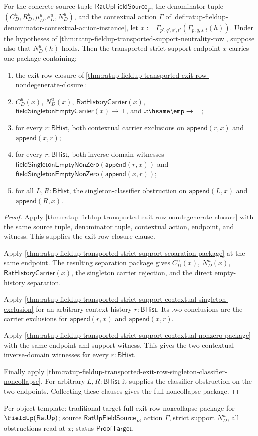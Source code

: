 \begin{theorem}
\label{thm:ratup-fieldup-transported-exit-row-full-noncollapse-package}
For the concrete source tuple $\mathsf{RatUpFieldSource}_F$, the denominator
tuple $(C_D^u,R_D^u,\mu_D^u,e_D^u,N_D^u)$, and the contextual action $\Gamma$ of
\autoref{def:ratup-fieldup-denominator-contextual-action-instance}, let
$x:=\Gamma_{p',q',s',t'}(\Gamma_{p,q,s,t}(h))$. Under the hypotheses of
\autoref{thm:ratup-fieldup-transported-support-neutrality-row}, suppose also
that $N_D^u(h)$ holds. Then the transported strict-support endpoint $x$
carries one package containing:
\begin{enumerate}
  \item the exit-row closure of
  \autoref{thm:ratup-fieldup-transported-exit-row-nondegenerate-closure};
  \item $C_D^u(x)$, $N_D^u(x)$, $\mathsf{RatHistoryCarrier}(x)$,
  $\mathsf{fieldSingletonEmptyCarrier}(x)\to\bot$, and $x\hsame\emp\to\bot$;
  \item for every $r:\mathsf{BHist}$, both contextual carrier exclusions on
  $\mathsf{append}(r,x)$ and $\mathsf{append}(x,r)$;
  \item for every $r:\mathsf{BHist}$, both inverse-domain witnesses
  $\mathsf{fieldSingletonEmptyNonZero}(\mathsf{append}(r,x))$ and
  $\mathsf{fieldSingletonEmptyNonZero}(\mathsf{append}(x,r))$;
  \item for all $L,R:\mathsf{BHist}$, the singleton-classifier obstruction on
  $\mathsf{append}(L,x)$ and $\mathsf{append}(R,x)$.
\end{enumerate}
\end{theorem}
\begin{proof}
Apply
\autoref{thm:ratup-fieldup-transported-exit-row-nondegenerate-closure} with the
same source tuple, denominator tuple, contextual action, endpoint, and witness.
This supplies the exit-row closure clause.

Apply
\autoref{thm:ratup-fieldup-transported-strict-support-separation-package} at
the same endpoint. The resulting separation package gives $C_D^u(x)$,
$N_D^u(x)$, $\mathsf{RatHistoryCarrier}(x)$, the singleton carrier rejection,
and the direct empty-history separation.

Apply
\autoref{thm:ratup-fieldup-transported-strict-support-contextual-singleton-exclusion}
for an arbitrary context history $r:\mathsf{BHist}$. Its two conclusions are
the carrier exclusions for $\mathsf{append}(r,x)$ and $\mathsf{append}(x,r)$.

Apply
\autoref{thm:ratup-fieldup-transported-strict-support-contextual-nonzero-package}
with the same endpoint and support witness. This gives the two contextual
inverse-domain witnesses for every $r:\mathsf{BHist}$.

Finally apply
\autoref{thm:ratup-fieldup-transported-exit-row-singleton-classifier-noncollapse}.
For arbitrary $L,R:\mathsf{BHist}$ it supplies the classifier obstruction on the
two endpoints. Collecting these clauses gives the full noncollapse package.
\end{proof}

Per-object template: traditional target full exit-row noncollapse package for
$\FieldUp(\mathsf{RatUp})$; source $\mathsf{RatUpFieldSource}_F$, action
$\Gamma$, strict support $N_D^u$, all obstructions read at $x$; status $\mathsf{ProofTarget}$.
